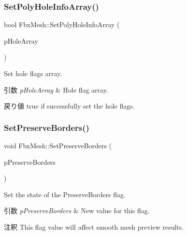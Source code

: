 \subsubsection{\texorpdfstring{Set\+Poly\+Hole\+Info\+Array()}{SetPolyHoleInfoArray()}}
{\footnotesize\ttfamily bool Fbx\+Mesh\+::\+Set\+Poly\+Hole\+Info\+Array (\begin{DoxyParamCaption}\item[{\hyperlink{class_fbx_array}{Fbx\+Array}$<$ bool $>$ $\ast$}]{p\+Hole\+Array }\end{DoxyParamCaption})}

Set hole flags array. 
\begin{DoxyParams}{引数}
{\em p\+Hole\+Array} & Hole flag array. \\
\hline
\end{DoxyParams}
\begin{DoxyReturn}{戻り値}
{\ttfamily true} if successfully set the hole flags. 
\end{DoxyReturn}
\mbox{\label{class_fbx_mesh_a462b090d01499b85ed9b19f42cdcef76}} 
\subsubsection{\texorpdfstring{Set\+Preserve\+Borders()}{SetPreserveBorders()}}
{\footnotesize\ttfamily void Fbx\+Mesh\+::\+Set\+Preserve\+Borders (\begin{DoxyParamCaption}\item[{bool}]{p\+Preserve\+Borders }\end{DoxyParamCaption})}

Set the state of the Preserve\+Borders flag. 
\begin{DoxyParams}{引数}
{\em p\+Preserve\+Borders} & New value for this flag. \\
\hline
\end{DoxyParams}
\begin{DoxyRemark}{注釈}
This flag value will affect smooth mesh preview results. 
\end{DoxyRemark}
\mbox{\label{class_fbx_mesh_adfaa804cd76983fc6a2603aef0c25acd}} 
